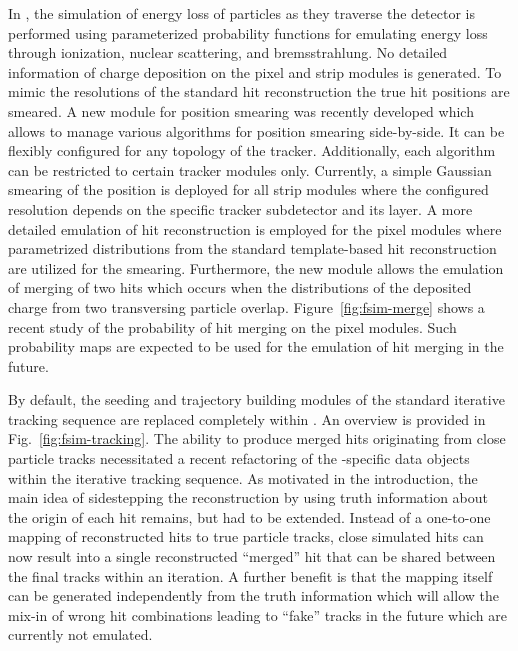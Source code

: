
In \FSIM, the simulation of energy loss of particles as they traverse the detector is performed using parameterized probability functions for emulating energy loss through ionization, nuclear scattering, and bremsstrahlung. No detailed information of charge deposition on the pixel and strip modules is generated. To mimic the resolutions of the standard hit reconstruction the true hit positions are smeared. A new \FSIM module for position smearing was recently developed which allows to manage various algorithms for position smearing side-by-side. It can be flexibly configured for any topology of the tracker. Additionally, each algorithm can be restricted to certain tracker modules only. Currently, a simple Gaussian smearing of the position is deployed for all strip modules where the configured resolution depends on the specific tracker subdetector and its layer. A more detailed emulation of hit reconstruction is employed for the pixel modules where parametrized distributions from the standard template-based hit reconstruction are utilized for the smearing. Furthermore, the new module allows the emulation of merging of two hits which occurs when the distributions of the deposited charge from two transversing particle overlap. Figure~\ref{fig:fsim-merge} shows a recent study of the probability of hit merging on the pixel modules. Such probability maps are expected to be used for the emulation of hit merging in the future.


By default, the seeding and trajectory building modules of the standard iterative tracking sequence are replaced completely within \FSIM. An overview is provided in Fig.~\ref{fig:fsim-tracking}. The ability to produce merged hits originating from close particle tracks necessitated a recent refactoring of the \FSIM{}-specific data objects within the iterative tracking sequence. As motivated in the introduction, the main idea of sidestepping the reconstruction by using truth information about the origin of each hit remains, but had to be extended. Instead of a one-to-one mapping of reconstructed hits to true particle tracks, close simulated hits can now result into a single reconstructed ``merged'' hit that can be shared between the final tracks within an iteration. A further benefit is that the mapping itself can be generated independently from the truth information which will allow the mix-in of wrong hit combinations leading to ``fake'' tracks in the future which are currently not emulated.

